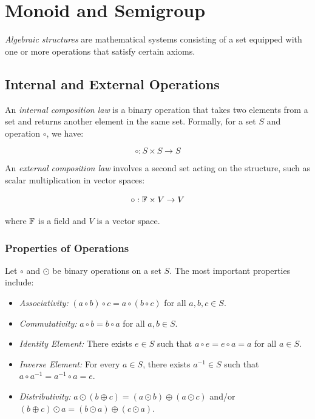 \chapter{Monoid and Semigroup}

\emph{Algebraic structures} are mathematical systems consisting of a set equipped with one or more operations
that satisfy certain axioms.

\section{Internal and External Operations}

An \emph{internal composition law} is a binary operation that takes two elements from a set and returns another element in the same set.
Formally, for a set \(S\) and operation \(\circ\), we have:

\[
	\circ: S \times S \to S
\]

An \emph{external composition law} involves a second set acting on the structure, such as scalar multiplication in vector spaces:

\[
	\circ: \mathbb{F} \times V \to V
\]

where \(\mathbb{F}\) is a field and \(V\) is a vector space.

\subsection{Properties of Operations}

Let \(\circ\) and \(\odot\) be binary operations on a set \(S\). The most important properties include:

\begin{itemize}

	\item \emph{Associativity:} \((a \circ b) \circ c  = a \circ (b \circ c)\) for all \(a,b,c \in S\).

	\item \emph{Commutativity:} \(a \circ b = b \circ a\) for all \(a,b \in S\).

	\item \emph{Identity Element:} There exists \(e \in S\) such that \(a \circ e = e \circ a = a\) for all \(a \in S\).

	\item \emph{Inverse Element:} For every \(a \in S\), there exists \(a^{-1} \in S\) such that \(a \circ a^{-1} = a^{-1} \circ a = e\).

	\item \emph{Distributivity:} \(a \odot (b \oplus c) = (a \odot b) \oplus (a \odot c)\) and/or \((b \oplus c) \odot a = (b \odot a) \oplus
	      (c \odot a)\).

\end{itemize}

